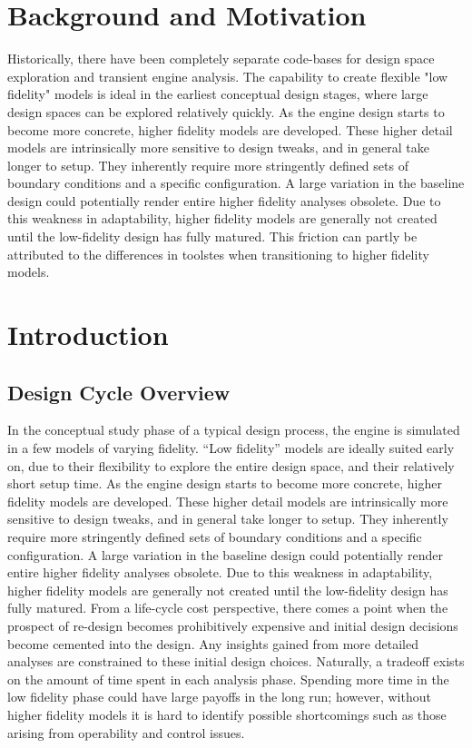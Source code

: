 \documentclass[heading.tex]{subfiles}
\begin{document}

\section{Background and Motivation}
Historically, there have been completely separate code-bases for design space exploration and transient engine analysis. The capability to create flexible "low fidelity" models is ideal in the earliest  conceptual design stages, where large design spaces can be explored relatively quickly. As the engine design starts to become more concrete, higher fidelity models are developed. These higher detail models are intrinsically more sensitive to design tweaks, and in general take longer to setup. They inherently require more stringently defined sets of boundary conditions and a specific configuration. A large variation in the baseline design could potentially render entire higher fidelity analyses obsolete. Due to this weakness in adaptability, higher fidelity models are generally not created until the low-fidelity design has fully matured. This friction can partly be attributed to the differences in toolstes when transitioning to higher fidelity models. 

\section{Introduction}
\subsection{Design Cycle Overview}

In the conceptual study phase of a typical design process, the engine is simulated in a few models of varying fidelity. “Low fidelity” models are ideally suited early on, due to their flexibility to explore the entire design space, and their relatively short setup time. As the engine design starts to become more concrete, higher fidelity models are developed. These higher detail models are intrinsically more sensitive to design tweaks, and in general take longer to setup. They inherently require more stringently defined sets of boundary conditions and a specific configuration. A large variation in the baseline design could potentially render entire higher fidelity analyses obsolete. Due to this weakness in adaptability, higher fidelity models are generally not created until the low-fidelity design has fully matured. 
	From a life-cycle cost perspective, there comes a point when the prospect of re-design becomes prohibitively expensive and initial design decisions become cemented into the design.  Any insights gained from more detailed analyses are constrained to these initial design choices. Naturally, a tradeoff exists on the amount of time spent in each analysis phase. Spending more time in the low fidelity phase could have large payoffs in the long run; however, without higher fidelity models it is hard to identify possible shortcomings such as those arising from operability and control issues.
\end{document}
